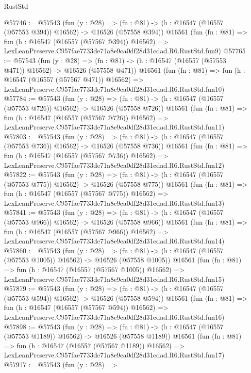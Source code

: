 \begin{lexlean}{RustStd}
\begin{coremodule}
@57746 := @57543
    (fun (y : @28) =>
    (fn : @81) -> (h : @16547 (@16557 (@57553 @394)) @16562) -> @16526 (@57558 @394))
    @16561
    (fun (fn : @81) =>
    fun (h : @16547 (@16557 (@57567 @394)) @16562) =>
    LexLeanPreserve.C957fae7733de71a8e9ca0df28d31cdad.R6.RustStd.fun9)
@57765 := @57543
    (fun (y : @28) =>
    (fn : @81) -> (h : @16547 (@16557 (@57553 @471)) @16562) -> @16526 (@57558 @471))
    @16561
    (fun (fn : @81) =>
    fun (h : @16547 (@16557 (@57567 @471)) @16562) =>
    LexLeanPreserve.C957fae7733de71a8e9ca0df28d31cdad.R6.RustStd.fun10)
@57784 := @57543
    (fun (y : @28) =>
    (fn : @81) -> (h : @16547 (@16557 (@57553 @726)) @16562) -> @16526 (@57558 @726))
    @16561
    (fun (fn : @81) =>
    fun (h : @16547 (@16557 (@57567 @726)) @16562) =>
    LexLeanPreserve.C957fae7733de71a8e9ca0df28d31cdad.R6.RustStd.fun11)
@57803 := @57543
    (fun (y : @28) =>
    (fn : @81) -> (h : @16547 (@16557 (@57553 @736)) @16562) -> @16526 (@57558 @736))
    @16561
    (fun (fn : @81) =>
    fun (h : @16547 (@16557 (@57567 @736)) @16562) =>
    LexLeanPreserve.C957fae7733de71a8e9ca0df28d31cdad.R6.RustStd.fun12)
@57822 := @57543
    (fun (y : @28) =>
    (fn : @81) -> (h : @16547 (@16557 (@57553 @775)) @16562) -> @16526 (@57558 @775))
    @16561
    (fun (fn : @81) =>
    fun (h : @16547 (@16557 (@57567 @775)) @16562) =>
    LexLeanPreserve.C957fae7733de71a8e9ca0df28d31cdad.R6.RustStd.fun13)
@57841 := @57543
    (fun (y : @28) =>
    (fn : @81) -> (h : @16547 (@16557 (@57553 @966)) @16562) -> @16526 (@57558 @966))
    @16561
    (fun (fn : @81) =>
    fun (h : @16547 (@16557 (@57567 @966)) @16562) =>
    LexLeanPreserve.C957fae7733de71a8e9ca0df28d31cdad.R6.RustStd.fun14)
@57860 := @57543
    (fun (y : @28) =>
    (fn : @81) -> (h : @16547 (@16557 (@57553 @1005)) @16562) -> @16526 (@57558 @1005))
    @16561
    (fun (fn : @81) =>
    fun (h : @16547 (@16557 (@57567 @1005)) @16562) =>
    LexLeanPreserve.C957fae7733de71a8e9ca0df28d31cdad.R6.RustStd.fun15)
@57879 := @57543
    (fun (y : @28) =>
    (fn : @81) -> (h : @16547 (@16557 (@57553 @594)) @16562) -> @16526 (@57558 @594))
    @16561
    (fun (fn : @81) =>
    fun (h : @16547 (@16557 (@57567 @594)) @16562) =>
    LexLeanPreserve.C957fae7733de71a8e9ca0df28d31cdad.R6.RustStd.fun16)
@57898 := @57543
    (fun (y : @28) =>
    (fn : @81) -> (h : @16547 (@16557 (@57553 @1189)) @16562) -> @16526 (@57558 @1189))
    @16561
    (fun (fn : @81) =>
    fun (h : @16547 (@16557 (@57567 @1189)) @16562) =>
    LexLeanPreserve.C957fae7733de71a8e9ca0df28d31cdad.R6.RustStd.fun17)
@57917 := @57543
    (fun (y : @28) =>

\end{coremodule}
\end{lexlean}

